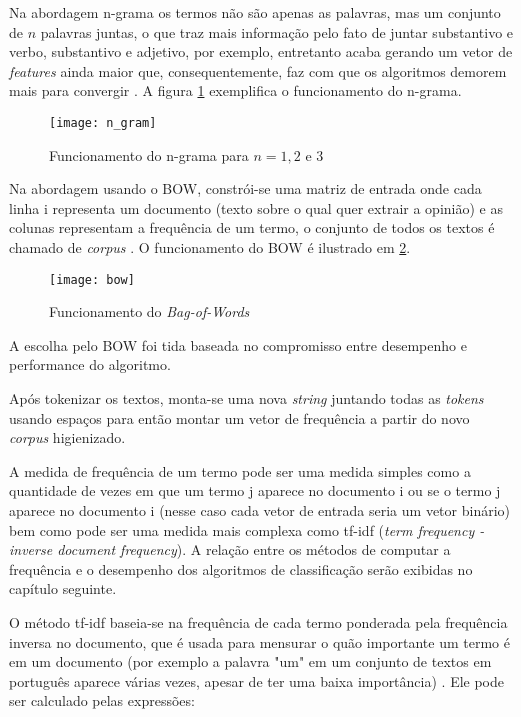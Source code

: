 Na abordagem n-grama os termos não são apenas as palavras, mas
um conjunto de $n$ palavras juntas, o que traz mais informação pelo fato de juntar substantivo e verbo, substantivo e adjetivo, por exemplo, entretanto acaba gerando um vetor de \textit{features}
ainda maior que, consequentemente, faz com que os algoritmos demorem mais para convergir \cite{ngram}. A figura 
\ref{fig:ngram} exemplifica o funcionamento do n-grama.


\begin{figure}[H]
	\centering	
	\texttt{[image: n\_gram]}
	\caption{Funcionamento do n-grama para $n = 1, 2$ e $3$}
	\label{fig:ngram}
\end{figure}

Na abordagem usando o BOW, constrói-se uma matriz de entrada onde cada linha i representa um documento 
(texto sobre o qual quer extrair a opinião) e as colunas representam a frequência de um termo, o 
conjunto de todos os textos é chamado de \textit{corpus} \cite{bow}. O funcionamento do BOW é ilustrado em \ref{fig:bow}.

\begin{figure}[H]
	\centering
	\texttt{[image: bow]}
	\caption{Funcionamento do \textit{Bag-of-Words}}
	\label{fig:bow}
\end{figure}

A escolha pelo BOW foi tida baseada no compromisso entre desempenho e performance do algoritmo.

Após tokenizar os textos, monta-se uma nova \textit{string} juntando todas as \textit{tokens} usando espaços para então montar um vetor de frequência a partir do novo \textit{corpus} higienizado.

A medida de frequência de um termo 
pode ser uma medida simples como a quantidade de vezes em que um termo j aparece no documento
i ou se o termo j aparece no documento i (nesse caso cada vetor de entrada seria um vetor binário) bem
como pode ser uma medida mais complexa como tf-idf (\textit{term frequency - inverse document frequency}).
A relação entre os métodos de computar a frequência e o desempenho dos algoritmos de classificação serão
exibidas no capítulo seguinte.

O método tf-idf baseia-se na frequência de cada termo ponderada pela frequência inversa no documento,
que é usada para mensurar o quão importante um termo é em um documento (por exemplo a palavra "um" em
um conjunto de textos em português aparece várias vezes, apesar de ter uma baixa importância) \cite{tf-idf}. 
Ele pode ser calculado pelas expressões:

